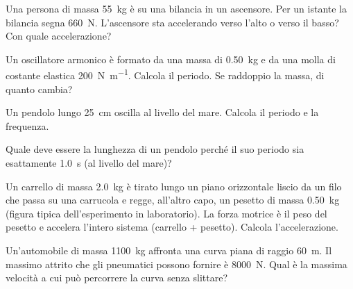 \begin{esercizio}
Una persona di massa \SI{55}{\kilo\gram} è su una bilancia in un ascensore. Per un istante la bilancia segna \SI{660}{\newton}. L'ascensore sta accelerando verso l'alto o verso il basso? Con quale accelerazione?\\
\end{esercizio}

\begin{esercizio}
Un oscillatore armonico è formato da una massa di \SI{0,50}{\kilo\gram} e da una molla di costante elastica \SI{200}{\newton\per\metre}. Calcola il periodo. Se raddoppio la massa, di quanto cambia?\\
\end{esercizio}

\begin{esercizio}
Un pendolo lungo \SI{25}{\centi\metre} oscilla al livello del mare. Calcola il periodo e la frequenza.\\
\end{esercizio}

\begin{esercizio}
Quale deve essere la lunghezza di un pendolo perché il suo periodo sia esattamente \SI{1,0}{\second} (al livello del mare)? \\
\end{esercizio}

\begin{esercizio}
Un carrello di massa \SI{2,0}{\kilo\gram} è tirato lungo un piano orizzontale liscio da un filo che passa su una carrucola e regge, all'altro capo, un pesetto di massa \SI{0,50}{\kilo\gram} (figura tipica dell'esperimento in laboratorio). La forza motrice è il peso del pesetto e accelera l'intero sistema (carrello + pesetto). Calcola l'accelerazione.\\
\end{esercizio}

\begin{esercizio}
Un'automobile di massa \SI{1100}{\kilo\gram} affronta una curva piana di raggio \SI{60}{\metre}. Il massimo attrito che gli pneumatici possono fornire è \SI{8000}{\newton}. Qual è la massima velocità a cui può percorrere la curva senza slittare?\\
\end{esercizio}
